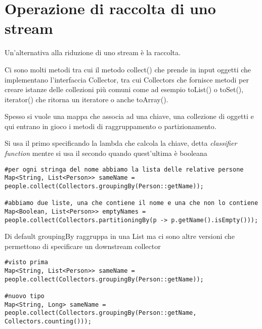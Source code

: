 

\section{Operazione di raccolta di uno stream}

Un'alternativa alla riduzione di uno stream è la raccolta.

Ci sono molti metodi tra cui il metodo collect() che prende in input oggetti che implementano l'interfaccia Collector, tra cui Collectors che fornisce metodi 
per creare istanze delle collezioni più comuni come ad esempio toList() o toSet(), iterator() che ritorna un iteratore o anche toArray().

Spesso si vuole una mappa che associa ad una chiave, una collezione di oggetti e qui entrano in gioco i metodi di raggruppamento o partizionamento.

Si usa il primo specificando la lambda che calcola la chiave, detta \textit{classifier function} mentre si usa il secondo quando quest'ultima è booleana
\begin{lstlisting}
#per ogni stringa del nome abbiamo la lista delle relative persone
Map<String, List<Person>> sameName = people.collect(Collectors.groupingBy(Person::getName));

#abbiamo due liste, una che contiene il nome e una che non lo contiene
Map<Boolean, List<Person>> emptyNames = people.collect(Collectors.partitioningBy(p -> p.getName().isEmpty()));
\end{lstlisting}

Di default groupingBy raggruppa in una List ma ci sono altre versioni che permettono di specificare un downstream collector
\begin{lstlisting}
#visto prima
Map<String, List<Person>> sameName = people.collect(Collectors.groupingBy(Person::getName));

#nuovo tipo
Map<String, Long> sameName = people.collect(Collectors.groupingBy(Person::getName, Collectors.counting()));
\end{lstlisting}